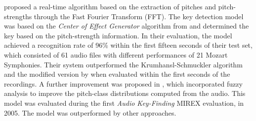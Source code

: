 \textcite{chuan2005polyphonic} proposed a real-time
algorithm based on the extraction of pitches and
pitch-strengths through the Fast Fourier Transform (FFT).
The key detection model was based on the \emph{Center of
Effect Generator} algorithm from \textcite{chew2002spiral}
and determined the key based on the pitch-strength
information. In their evaluation, the model achieved a
recognition rate of 96\% within the first fifteen seconds of
their test set, which consisted of 61 audio files with
different performances of 21 Mozart Symphonies. Their system
outperformed the Krumhansl-Schmuckler algorithm
\parencite{krumhansl1990cognitive} and the modified version
by \textcite{temperley1999whats} when evaluated within the
first seconds of the recordings. A further improvement was
proposed in \textcite{chuan2005fuzzy}, which incorporated
fuzzy analysis to improve the pitch-class distributions
computed from the audio. This model was evaluated during the
first \emph{Audio Key-Finding} MIREX evaluation, in 2005.
The model was outperformed by other approaches.




